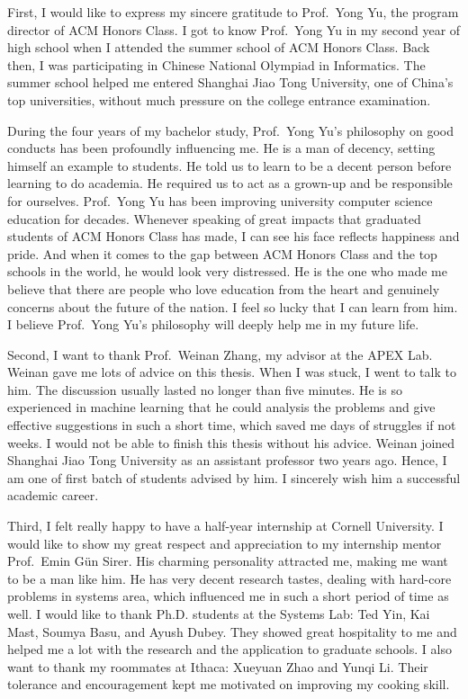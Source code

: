 
\begin{thanks}

    First, I would like to express my sincere gratitude to Prof.~Yong Yu,
    the program director of ACM Honors Class.
    I got to know Prof.~Yong Yu in my second year of high school
    when I attended the summer school of ACM Honors Class.
    Back then, I was participating in Chinese National Olympiad in Informatics.
    The summer school helped me entered Shanghai Jiao Tong University,
    one of China's top universities, without much pressure on the college entrance examination.

    During the four years of my bachelor study,
    Prof.~Yong Yu's philosophy on good conducts has been profoundly influencing me.
    He is a man of decency, setting himself an example to students.
    He told us to learn to be a decent person before learning to do academia.
    He required us to act as a grown-up and be responsible for ourselves.
    Prof.~Yong Yu has been improving university computer science education for decades.
    Whenever speaking of great impacts that graduated students of ACM Honors Class has made,
    I can see his face reflects happiness and pride.
    And when it comes to the gap between ACM Honors Class and the top schools in the world,
    he would look very distressed.
    He is the one who made me believe that there are people who love education from the heart
    and genuinely concerns about the future of the nation.
    I feel so lucky that I can learn from him.
    I believe Prof.~Yong Yu's philosophy will deeply help me in my future life.

    Second, I want to thank Prof.~Weinan Zhang, my advisor at the APEX Lab.
    Weinan gave me lots of advice on this thesis.
    When I was stuck, I went to talk to him.
    The discussion usually lasted no longer than five minutes.
    He is so experienced in machine learning that he could analysis the problems
    and give effective suggestions in such a short time,
    which saved me days of struggles if not weeks.
    I would not be able to finish this thesis without his advice.
    Weinan joined Shanghai Jiao Tong University as an assistant professor two years ago.
    Hence, I am one of first batch of students advised by him.
    I sincerely wish him a successful academic career.

    Third, I felt really happy to have a half-year internship at Cornell University.
    I would like to show my great respect and appreciation to my internship mentor Prof.~Emin Gün Sirer.
    His charming personality attracted me, making me want to be a man like him.
    He has very decent research tastes, dealing with hard-core problems in systems area,
    which influenced me in such a short period of time as well.
    I would like to thank Ph.D. students at the Systems Lab: Ted Yin, Kai Mast, Soumya Basu, and Ayush Dubey.
    They showed great hospitality to me
    and helped me a lot with the research and the application to graduate schools.
    I also want to thank my roommates at Ithaca: Xueyuan Zhao and Yunqi Li.
    Their tolerance and encouragement kept me motivated on improving my cooking skill.


\end{thanks}
